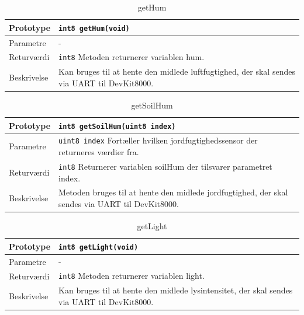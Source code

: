 
\begin{table}[h]
\begin{tabularx}{\textwidth}{| >{\raggedright\arraybackslash}p{2.5 cm} | >{\raggedright\arraybackslash}X |} \hline
Prototype & \texttt{int8 getHum(void)} \\\hline
Parametre & - \\\hline
Returværdi & \texttt{int8} \newline
Metoden returnerer variablen hum. \\\hline
Beskrivelse & Kan bruges til at hente den midlede luftfugtighed, der skal sendes via UART til DevKit8000. \\\hline
\end{tabularx}
\caption{getHum}
\label{table:getHum_DSP}
\end{table}


\clearpage

\begin{table}[h]
\begin{tabularx}{\textwidth}{| >{\raggedright\arraybackslash}p{2.5 cm} | >{\raggedright\arraybackslash}X |} \hline
Prototype & \texttt{int8 getSoilHum(uint8 index)} \\\hline
Parametre & \texttt{uint8 index} \newline
Fortæller hvilken jordfugtighedssensor der returneres værdier fra. \\\hline
Returværdi & \texttt{int8} \newline
Returnerer variablen soilHum der tilsvarer parametret index. \\\hline
Beskrivelse & Metoden bruges til at hente den midlede jordfugtighed, der skal sendes via UART til DevKit8000. \\\hline
\end{tabularx}
\caption{getSoilHum}
\label{table:getSoilHum_DSP}
\end{table}


\begin{table}[h]
\begin{tabularx}{\textwidth}{| >{\raggedright\arraybackslash}p{2.5 cm} | >{\raggedright\arraybackslash}X |} \hline
Prototype & \texttt{int8 getLight(void)} \\\hline
Parametre & - \\\hline
Returværdi & \texttt{int8} \newline
Metoden returnerer variablen light. \\\hline
Beskrivelse & Kan bruges til at hente den midlede lysintensitet, der skal sendes via UART til DevKit8000. \\\hline
\end{tabularx}
\caption{getLight}
\label{table:getLight_DSP}
\end{table}

